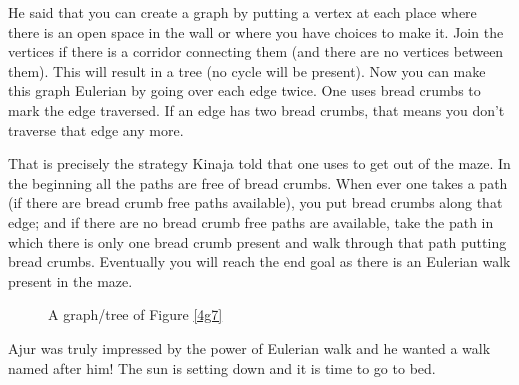 He said that you can create a graph by putting a vertex at each place where there is an open space in the wall or where you have choices to make it. Join the vertices if there is a corridor connecting them (and there are no vertices between them). This will result in a tree (no cycle will be present). Now you can make this graph Eulerian by going over each edge twice. One uses bread crumbs to mark the edge traversed. If an edge has two bread crumbs, that means you don't traverse that edge any more.

That is precisely the strategy Kinaja told that one uses to get out of the maze.  In the beginning all the paths are free of bread crumbs. When ever one takes a path (if there are bread crumb free paths available), you put bread crumbs along that edge; and if there are no bread crumb free paths are available, take the path in which there is only one bread crumb present and walk through that path putting bread crumbs. Eventually you will reach the end goal as there is an Eulerian walk present in the maze.

\begin{figure}
\begin{center}
\caption{ A graph/tree of Figure \ref{4g7}}\label{4g8}
\end{center}
\end{figure}

Ajur was truly impressed by the power of Eulerian walk and he wanted a walk named after him! The sun is setting down and it is time to go to bed.